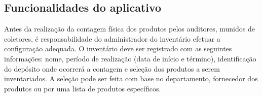 \subsection{Funcionalidades do aplicativo}

Antes da realização da contagem física dos produtos pelos auditores, munidos de coletores, é responsabilidade do administrador do inventário efetuar a configuração adequada. O inventário deve ser registrado com as seguintes informações: nome, período de realização (data de início e término), identificação do depósito onde ocorrerá a contagem e seleção dos produtos a serem inventariados. A seleção pode ser feita com base no departamento, fornecedor dos produtos ou por uma lista de produtos específicos.

\begin{figure}[!htb]
    \centering
    \quad
    \quad
    \quad
\end{figure}
